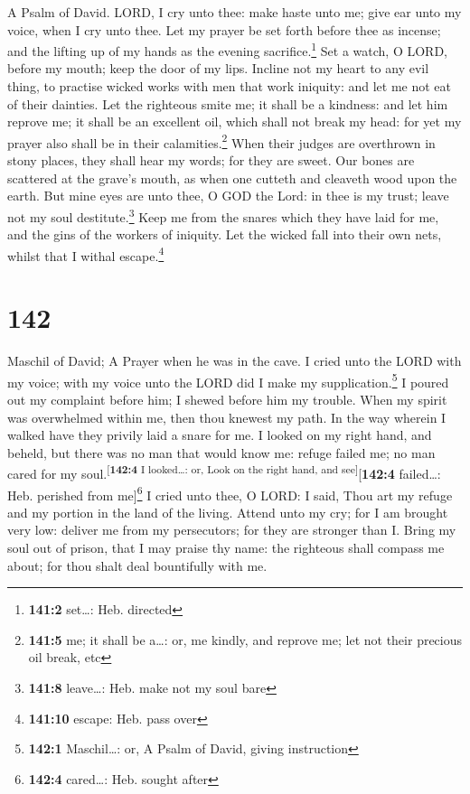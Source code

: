 A Psalm of David.  LORD, I cry unto thee: make haste unto
me; give ear unto my voice, when I cry unto thee.  Let my
prayer be set forth before thee as incense; and the lifting up of my
hands as the evening sacrifice.\footnote{\textbf{141:2} set\ldots: Heb.
  directed}  Set a watch, O LORD, before my mouth; keep
the door of my lips.  Incline not my heart to any evil
thing, to practise wicked works with men that work iniquity: and let me
not eat of their dainties.  Let the righteous smite me; it
shall be a kindness: and let him reprove me; it shall be an excellent
oil, which shall not break my head: for yet my prayer also shall be in
their calamities.\footnote{\textbf{141:5} me; it shall be a\ldots: or,
  me kindly, and reprove me; let not their precious oil break, etc}
 When their judges are overthrown in stony places, they
shall hear my words; for they are sweet.  Our bones are
scattered at the grave's mouth, as when one cutteth and cleaveth wood
upon the earth.  But mine eyes are unto thee, O GOD the
Lord: in thee is my trust; leave not my soul destitute.\footnote{\textbf{141:8}
  leave\ldots: Heb. make not my soul bare}  Keep me from
the snares which they have laid for me, and the gins of the workers of
iniquity.  Let the wicked fall into their own nets,
whilst that I withal escape.\footnote{\textbf{141:10} escape: Heb. pass
  over}

\hypertarget{section-143}{%
\section{142}\label{section-143}}

Maschil of David; A Prayer when he was in the cave.  I
cried unto the LORD with my voice; with my voice unto the LORD did I
make my supplication.\footnote{\textbf{142:1} Maschil\ldots: or, A Psalm
  of David, giving instruction}  I poured out my complaint
before him; I shewed before him my trouble.  When my
spirit was overwhelmed within me, then thou knewest my path. In the way
wherein I walked have they privily laid a snare for me.  I
looked on my right hand, and beheld, but there was no man that would
know me: refuge failed me; no man cared for my
soul.\textsuperscript{{[}\textbf{142:4} I looked\ldots: or, Look on the
right hand, and see{]}}{[}\textbf{142:4} failed\ldots: Heb. perished
from me{]}\footnote{\textbf{142:4} cared\ldots: Heb. sought after}
 I cried unto thee, O LORD: I said, Thou art my refuge and
my portion in the land of the living.  Attend unto my cry;
for I am brought very low: deliver me from my persecutors; for they are
stronger than I.  Bring my soul out of prison, that I may
praise thy name: the righteous shall compass me about; for thou shalt
deal bountifully with me.

